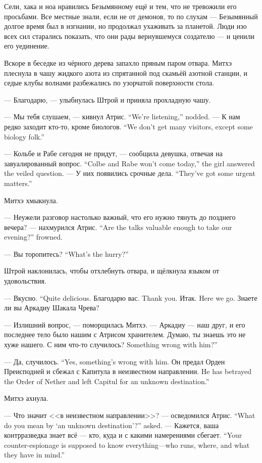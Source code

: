 Сели, хака и ноа нравились Безымянному ещё и тем, что не тревожили его просьбами.
Все местные знали, если не от демонов, то по слухам --- Безымянный долгое время был в изгнании, но продолжал ухаживать за планетой.
Люди изо всех сил старались показать, что они рады вернувшемуся создателю --- и ценили его уединение.

Вскоре в беседке из чёрного дерева запахло пряным паром отвара.
Митхэ плеснула в чашу жидкого азота из спрятанной под скамьёй азотной станции, и седые клубы волнами разбежались по узорчатой поверхности стола.

--- Благодарю, --- улыбнулась Штрой и приняла прохладную чашу.

{--- Мы тебя слушаем, --- кивнул Атрис.}
{``We're listening,'' \Aatris{} nodded.}
{--- К нам редко заходит кто-то, кроме биологов.}
{``We don't get many visitors, except some biology folk.''}

{--- Кольбе и Рабе сегодня не придут, --- сообщила девушка, отвечая на завуалированный вопрос.}
{``Colbe and Rabe won't come today,'' the girl answered the veiled question.}
{--- У них появились срочные дела.}
{``They've got some urgent matters.''}

Митхэ хмыкнула.

{--- Неужели разговор настолько важный, что его нужно тянуть до позднего вечера? --- нахмурился Атрис.}
{``Are the talks valuable enough to take our evening?'' \Aatris{} frowned.}

{--- Вы торопитесь?}
{``What's the hurry?''}

Штрой наклонилась, чтобы отхлебнуть отвара, и щёлкнула языком от удовольствия.

{--- Вкусно.}
{``Quite delicious.}
{Благодарю вас.}
{Thank you.}
{Итак.}
{Here we go.}
Знаете ли вы Аркадиу Шакала Чрева?

--- Излишний вопрос, --- поморщилась Митхэ.
--- Аркадиу --- наш друг, и его последнее тело было нашим с Атрисом хранителем.
Думаю, ты знаешь это не хуже нашего.
{С ним что-то случилось?}
{Something wrong with him?''}

{--- Да, случилось.}
{``Yes, something's wrong with him.}
{Он предал Орден Преисподней и сбежал с Капитула в неизвестном направлении.}
{He has betrayed the Order of Nether and left Capitul for an unknown destination.''}

Митхэ ахнула.

{--- Что значит <<в неизвестном направлении>>? --- осведомился Атрис.}
{``What do you mean by `an unknown destination'?'' \Aatris{} asked.}
{--- Кажется, ваша контрразведка знает всё --- кто, куда и с какими намерениями сбегает.}
{``Your counter-espionage is supposed to know everything---who runs, where, and what they have in mind.''}

